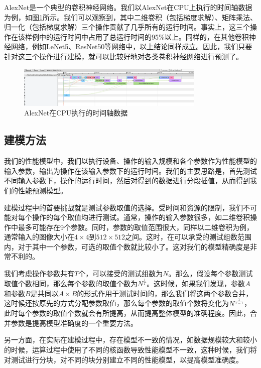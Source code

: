     AlexNet\cite{alexnet}是一个典型的卷积神经网络。我们以AlexNet在CPU上执行的时间轴数据为例，如图\ref{fig:alexnet_timeline}所示。我们可以观察到，其中二维卷积（包括梯度求解）、矩阵乘法、归一化（包括梯度求解）三个操作贡献了几乎所有的运行时间。事实上，这三个操作在该样例中的运行时间中占用了总运行时间的95\%以上。同样的，在其他卷积神经网络，例如LeNet5、ResNet50等网络中，以上结论同样成立。因此，我们只要针对这三个操作进行建模，就可以比较好地对各类卷积神经网络进行预测了。

    \begin{figure}[!htbp]
        \centering
        \includegraphics[width=0.8\textwidth]{figures/alexnet_timeline.png}
        \caption{AlexNet在CPU执行的时间轴数据}
        \label{fig:alexnet_timeline}
    \end{figure}

\subsection{建模方法}
\label{ssec:model}
    我们的性能模型中，我们以执行设备、操作的输入规模和各个参数作为性能模型的输入参数，输出为操作在该输入参数下的运行时间。我们的主要思路是，首先测试不同输入参数下，操作的运行时间，然后对得到的数据进行分段插值，从而得到我们的性能预测模型。
    
    建模过程中的首要挑战就是测试参数取值的选择。受时间和资源的限制，我们不可能对每个操作的每个取值均进行测试。通常，操作的输入参数很多，如二维卷积操作中最多可能存在9个参数。同时，参数的取值范围很大，同样以二维卷积为例，通常输入的图像大小在$ 4 \times 4 $到$ 512 \times 512 $之间。这时，在可以承受的测试组数范围内，对于其中一个参数，可选的取值个数就比较小了。这对我们的模型精确度是非常不利的。
    
    我们考虑操作参数共有$ T $个，可以接受的测试组数为$ N $。那么，假设每个参数测试取值个数相同，那么每个参数的取值个数为$ N^{\frac{1}{T}} $。这时候，如果我们发现，参数$ A $和参数$ B $是共同以$ A \times B $的形式作用于测试时间的，那么我们将这两个参数合并，这时候还按原先的方式分配参数取值，那么每个参数的取值个数将变化为$ N^{\frac{1}{T-1}} $，此时每个参数的取值个数就会有所提高，从而提高整体模型的准确程度。因此，合并参数是提高模型准确度的一个重要方法。
    
    另一方面，在实际在建模过程中，存在模型不一致的情况，如数据规模较大和较小的时候，运算过程中使用了不同的核函数导致性能模型不一致，这种时候，我们将对测试进行分块，对不同的块分别建立不同的性能模型，以提高模型准确度。
    
